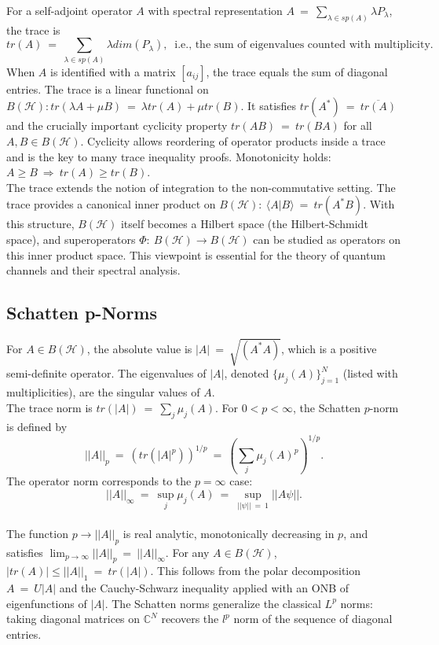 \documentclass[11pt,a4paper]{article}
\begin{document}
For a self-adjoint operator $A$ with spectral representation $A\ =\ \sum_{\lambda \in sp(A)} \lambda P_\lambda$, the trace is $$tr(A)\ =\ \sum_{\lambda \in sp(A)} \lambda dim(P_\lambda),\ \text{ i.e., the sum of eigenvalues counted with multiplicity.}$$ When $A$ is identified with a matrix $[a_{ij}]$, the trace equals the sum of diagonal entries. The trace is a linear functional on $B(\mathcal{H}): tr(\lambda A + \mu B)\ =\ \lambda tr(A) + \mu tr(B)$. It satisfies $tr(A^*)\ =\ \overline{tr(A)}$ and the crucially important cyclicity property $tr(AB)\ =\ tr(BA)$ for all $A, B \in B(\mathcal{H})$. Cyclicity allows reordering of operator products inside a trace and is the key to many trace inequality proofs. Monotonicity holds: $A \geq B\ \Rightarrow\ tr(A) \geq tr(B)$. \\

The trace extends the notion of integration to the non-commutative setting. The trace provides a canonical inner product on $B(\mathcal{H}):\ \langle A|B \rangle\ =\ tr(A^*B)$. With this structure, $B(\mathcal{H})$ itself becomes a Hilbert space (the Hilbert-Schmidt space), and superoperators $\Phi:\ B(\mathcal{H}) \rightarrow B(\mathcal{H})$ can be studied as operators on this inner product space. This viewpoint is essential for the theory of quantum channels and their spectral analysis.

\subsection{Schatten p-Norms}
For $A \in B(\mathcal{H})$, the absolute value is $|A|\ =\ \sqrt{(A^*A)}$, which is a positive semi-definite operator. The eigenvalues of $|A|$, denoted $\{\mu_j(A)\}_{j=1}^N$ (listed with multiplicities), are the singular values of $A$.\\ The trace norm is $tr(|A|)\ =\ \sum_j \mu_j(A)$. For $0 < p < \infty$, the Schatten $p$-norm is defined by $$||A||_p\ =\ \left( tr(|A|^p) \right)^{1/p}\ =\ \left( \sum_j \mu_j(A)^p \right)^{1/p}.$$ The operator norm corresponds to the $p = \infty$ case: $$||A||_\infty\ =\ \sup_j \mu_j(A)\ =\ \sup_{||\psi||\ =\ 1} ||A \psi||.$$ \\

The function $p \rightarrow ||A||_p$ is real analytic, monotonically decreasing in $p$, and satisfies $\lim_{p\rightarrow\infty} ||A||_p\ =\ ||A||_\infty$. For any $A \in B(\mathcal{H})$, $|tr(A)| \leq ||A||_1\ =\ tr(|A|)$. This follows from the polar decomposition $A\ =\ U|A|$ and the Cauchy-Schwarz inequality applied with an ONB of eigenfunctions of $|A|$. The Schatten norms generalize the classical $L^p$ norms: taking diagonal matrices on $\mathbb{C}^N$ recovers the $l^p$ norm of the sequence of diagonal entries. \\
\end{document}

